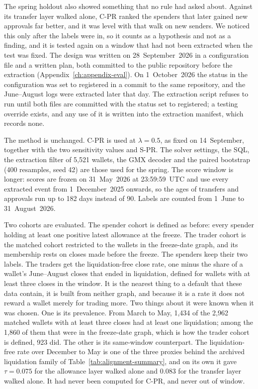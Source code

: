 
The spring holdout also showed something that no rule had asked about. Against its transfer layer walked alone, C-PR ranked the spenders that later gained new approvals far better, and it was level with that walk on new senders. We noticed this only after the labels were in, so it counts as a hypothesis and not as a finding, and it is tested again on a window that had not been extracted when the test was fixed. The design was written on 28~September~2026 in a configuration file and a written plan, both committed to the public repository before the extraction (Appendix~\ref{ch:appendix-eval}). On 1~October~2026 the status in the configuration was set to registered in a commit to the same repository, and the June--August logs were extracted later that day. The extraction script refuses to run until both files are committed with the status set to registered; a testing override exists, and any use of it is written into the extraction manifest, which records none.

The method is unchanged. C-PR is used at $\lambda=0.5$, as fixed on 14~September, together with the two sensitivity values and S-PR. The solver settings, the SQL, the extraction filter of 5,521 wallets, the GMX decoder and the paired bootstrap (400 resamples, seed 42) are those used for the spring. The score window is longer: scores are frozen on 31~May~2026 at 23:59:59~UTC and use every extracted event from 1~December~2025 onwards, so the ages of transfers and approvals run up to 182 days instead of 90. Labels are counted from 1~June to 31~August~2026.

Two cohorts are evaluated. The spender cohort is defined as before: every spender holding at least one positive latest allowance at the freeze. The trader cohort is the matched cohort restricted to the wallets in the freeze-date graph, and its membership rests on closes made before the freeze. The spenders keep their two labels. The traders get the liquidation-free close rate, one minus the share of a wallet's June--August closes that ended in liquidation, defined for wallets with at least three closes in the window. It is the nearest thing to a default that these data contain, it is built from neither graph, and because it is a rate it does not reward a wallet merely for trading more. Two things about it were known when it was chosen. One is its prevalence. From March to May, 1,434 of the 2,962 matched wallets with at least three closes had at least one liquidation; among the 1,860 of them that were in the freeze-date graph, which is how the trader cohort is defined, 923 did. The other is its same-window counterpart. The liquidation-free rate over December to May is one of the three proxies behind the archived liquidation family of Table~\ref{tab:alignment-summary}, and on its own it gave $\tau=0.075$ for the allowance layer walked alone and $0.083$ for the transfer layer walked alone. It had never been computed for C-PR, and never out of window.

